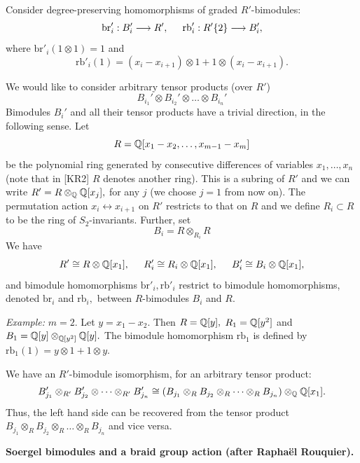 \documentclass[12pt]{article}
\begin{document}
Consider degree-preserving homomorphisms of graded $R'$-bimodules:  
$$ \mathrm{br}'_i: B_i'\longrightarrow R', \hspace{0.2in} 
     \mathrm{rb}'_i: R'\{2\} \longrightarrow B_i', $$ 
where $\mathrm{br}'_i(1\otimes 1) = 1$ and 
$$ \mathrm{rb}'_i(1) = (x_i-x_{i+1})\otimes 1 + 1\otimes 
 (x_i-x_{i+1}).$$ 

We would like to consider arbitrary tensor products (over $R'$)  
$$B_{i_1}'\otimes B_{i_2}'\otimes \dots \otimes B_{i_n}'$$ 
Bimodules $B_i'$ and all their tensor products have a trivial 
direction, in the following sense. Let 
$$R= \mathbb Q[x_1-x_2, \dots, x_{m-1}-x_m]$$  
be the polynomial ring generated by consecutive differences 
of variables $x_1, \dots, x_n$ (note that in [KR2]  $R$ denotes 
another ring).  This is a subring of $R'$ and 
we can write $ R'= R\otimes_{\mathbb Q} \mathbb Q[x_j],$ for any $j$ (we 
choose $j=1$ from now on). The 
permutation action $x_i\leftrightarrow x_{i+1}$  on $R'$ restricts 
to that on $R$ and we define $R_i\subset R$ to be the ring 
of $S_2$-invariants. Further, set 
$$B_i = R\otimes_{R_i} R $$ 
We have 
$$R' \cong R\otimes \mathbb Q[x_1], \hspace{0.2in} R_i'\cong R_i\otimes \mathbb Q[x_1], 
\hspace{0.2in} B_i' \cong  B_i \otimes \mathbb Q[x_1],$$ 
and bimodule homomorphisms $\mathrm{br}'_i , \mathrm{rb}'_i$ 
restrict to bimodule homomorphisms, denoted $\mathrm{br}_i $ and $\mathrm{rb}_i,$ 
between $R$-bimodules $B_i$ and $R.$ 

\emph{Example:} $m=2.$ Let $y=x_1-x_2.$ Then $R=\mathbb Q[y], 
$ $R_1= \mathbb Q[y^2]$ and $B_1= \mathbb Q[y]\otimes_{\mathbb Q[y^2]} \mathbb Q[y].$ 
The bimodule homomorphism $\mathrm{rb}_1$ is defined by 
$\mathrm{rb}_1(1) = y \otimes 1 + 1\otimes y.$   

We have an $R'$-bimodule isomorphism, for an arbitrary tensor product: 
$$ B'_{j_1}\otimes_{R'} B'_{j_2}\otimes \dots \otimes_{R'} B'_{j_n} \cong 
  (B_{j_1}\otimes_R B_{j_2} \otimes_R \dots \otimes_R B_{j_n} ) \otimes_{\mathbb Q} 
   \mathbb Q[x_1].$$ 
Thus, the left hand side can be recovered from the tensor product 
$B_{j_1}\otimes_R B_{j_2} \otimes_R \dots \otimes_R B_{j_n}$ and 
vice versa. 


\vspace{0.35in} 

\noindent
{\bf Soergel bimodules and a braid group action (after Rapha\"el Rouquier).} 
\end{document}
